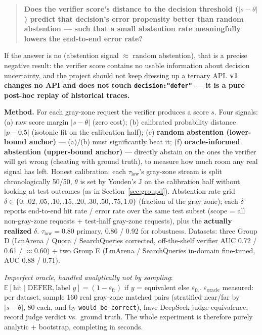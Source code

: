 \documentclass[11pt]{article}
\newcommand{\taulow}{\ensuremath{\tau_{\text{low}}}}
\begin{document}
\begin{quote}
\textbf{Does the verifier score's distance to the decision threshold ($|s - \theta|$) predict that decision's error propensity better than random abstention --- such that a small abstention rate meaningfully lowers the end-to-end error rate?}
\end{quote}

If the answer is no (abstention signal $\approx$ random abstention), that is a precise negative result: the verifier score contains no usable information about decision uncertainty, and the project should not keep dressing up a ternary API. \textbf{v1 changes no API and does not touch \texttt{decision:\allowbreak{}"defer"} --- it is a pure post-hoc replay of historical traces.}

\textbf{Method.} For each gray-zone request the verifier produces a score $s$. Four signals: (a) raw score margin $|s - \theta|$ (zero cost); (b) calibrated probability distance $|p - 0.5|$ (isotonic fit on the calibration half); (e) \textbf{random abstention (lower-bound anchor)} --- (a)/(b) must significantly beat it; (f) \textbf{oracle-informed abstention (upper-bound anchor)} --- directly abstain on the ones the verifier will get wrong (cheating with ground truth), to measure how much room any real signal has left. Honest calibration: each \taulow's gray-zone stream is split chronologically 50/50, $\theta$ is set by Youden's J on the calibration half without looking at test outcomes (as in Section~\ref{sec:groupd}). Abstention-rate grid $\delta \in \{0, .02, .05, .10, .15, .20, .30, .50, .75, 1.0\}$ (fraction of the gray zone); each $\delta$ reports end-to-end hit rate / error rate over the same test subset (scope = all non-gray-zone requests + test-half gray-zone requests), plus the \textbf{actually realized} $\delta$. $\taulow = 0.80$ primary, 0.86 / 0.92 for robustness. Datasets: three Group D (LmArena / Quora / SearchQueries corrected, off-the-shelf verifier AUC 0.72 / 0.61 / $\approx$0.60) + two Group E (LmArena / SearchQueries in-domain fine-tuned, AUC 0.88 / 0.71).

\emph{Imperfect oracle, handled analytically not by sampling}: $\mathbb{E}[\text{hit} \mid \text{DEFER}, \text{label } y] = (1 - \varepsilon_\text{fr})$ if $y$ = equivalent else $\varepsilon_\text{fa}$. $\varepsilon_\text{oracle}$ measured: per dataset, sample 160 real gray-zone matched pairs (stratified near/far by $|s - \theta|$, 80 each, and by \texttt{would\_\allowbreak{}be\_\allowbreak{}correct}), have DeepSeek judge equivalence, record judge verdict vs.\ ground truth. The whole experiment is therefore purely analytic + bootstrap, completing in seconds.
\end{document}

